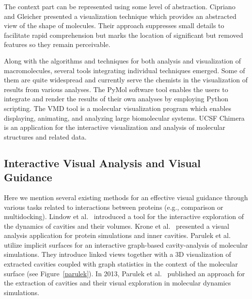 \documentclass[11pt,a4paper,titlepage,oneside,onecolumn]{article}
\begin{document}
The context part can be represented using some level of abstraction. Cipriano and Gleicher \cite{cipriano} presented a visualization technique which provides an abstracted view of the shape of molecules.
Their approach suppresses small details to facilitate rapid comprehension but marks the location of significant but removed features so they remain perceivable.

Along with the algorithms and techniques for both analysis and visualization of macromolecules, several tools integrating individual techniques emerged. 
Some of them are quite widespread and currently serve the chemists in the visualization of results from various analyses. 
The PyMol software tool \cite{pymol} enables the users to integrate and render the results of their own analyses by employing Python scripting. 
The VMD tool \cite{VMD} is a molecular visualization program which enables displaying, animating, and analyzing large biomolecular systems. 
UCSF Chimera \cite{chimera} is an application for the interactive visualization and analysis of molecular structures and related data. 


\subsection{Interactive Visual Analysis and Visual Guidance}
Here we mention several existing methods for an effective visual guidance through various tasks related to interactions between proteins (e.g., comparison or multidocking). 
Lindow et al.~\cite{Lindow2013} introduced a tool for the interactive exploration of the dynamics of cavities and their volumes.
Krone et al.~\cite{Krone2014} presented a visual analysis application for protein simulations and inner cavities.
Parulek et al.~\cite{parulek2012implicit} utilize implicit surfaces for an interactive graph-based cavity-analysis of molecular simulations. 
They introduce linked views together with a 3D visualization of extracted cavities coupled with graph statistics in the context of the molecular surface (see Figure~\ref{parulek}). 
In 2013, Parulek et al.~\cite{parulek13visualanalysis} published an approach for the extraction of cavities and their visual exploration in molecular dynamics simulations. 
\end{document}

